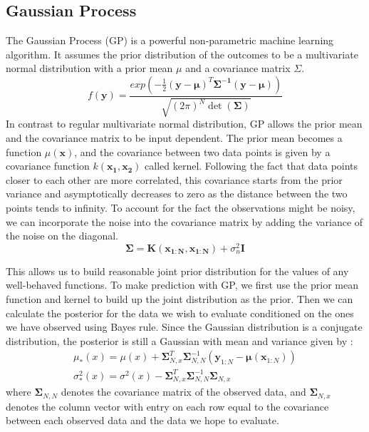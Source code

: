 \documentclass[journal]{IEEEtran}
\begin{document}
\subsection{Gaussian Process}
The Gaussian Process (GP) is a powerful non-parametric machine learning algorithm. 
It assumes the prior distribution of the outcomes to be a multivariate normal distribution with a prior mean $\mu$ and a covariance matrix $\Sigma$. 
\begin{equation}
f(\bm{y}) = \frac{exp(
-\frac{1}{2}(\bm{y} - \bm{\mu})^T \bm{\Sigma^{-1}} (\bm{y} - \bm{\mu})
)}
{
\sqrt{(2\pi)^N \det(\bm{\Sigma})}
}
\label{multi_normal}
\end{equation}
In contrast to regular multivariate normal distribution, GP allows the prior mean and the covariance matrix to be input dependent. The
prior mean becomes a function $\mu(\bm{x})$, and the covariance between two data points is given by a covariance function 
$k(\bm{x_1}, \bm{x_2})$ called kernel. 
Following the fact that data points closer to each other are more correlated, this covariance starts from the prior variance and asymptotically decreases to zero as the distance between the two points tends to infinity. 
To account for the fact the observations might be noisy, we can incorporate the noise into the covariance matrix by adding the variance of the noise on the diagonal.
\begin{equation}
\bm{\Sigma} = \bm{K}(\bm{x_{1:N}}, \bm{x_{1:N}}) + \sigma_n^2 \mathbf{I}
\label{covariance_matrix}
\end{equation}

This allows us to build reasonable joint prior distribution for the values of any well-behaved functions.
To make prediction with GP, we first use the prior mean function and kernel to build up the joint distribution as the prior. 
Then we can calculate the posterior for the data we wish to evaluate conditioned on the ones we have observed using Bayes rule.
Since the Gaussian distribution is a conjugate distribution, the posterior is still a Gaussian with mean and variance given by \cite{GP, GP_posterior}:
\begin{equation}
\begin{gathered}
\mu_*(x) = \mu(x) + 
\bm{\Sigma}_{N, x}^T
\bm{\Sigma}_{N, N}^{-1}
(\bm{y}_{1:N} - \bm{\mu}(\bm{x}_{1:N}))
\\
\sigma^2_*(x) = \sigma^2(x) -  
\bm{\Sigma}_{N, x}^T
\bm{\Sigma}_{N, N}^{-1}
\bm{\Sigma}_{N, x}
\end{gathered}
\label{GP_posterior}
\end{equation}
where $\bm{\Sigma}_{N, N}$ denotes the covariance matrix of the observed data, and $\bm{\Sigma}_{N, x}$ denotes the column vector with entry on each row equal to the covariance between 
each observed data and the data we hope to evaluate.
\end{document}
